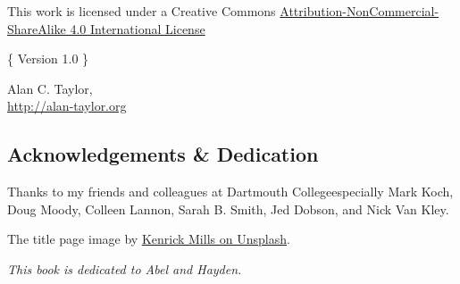 

\vspace*{4cm}
\begin{center}


\ccbyncsa 

\vspace{1cm}

This work is licensed under a Creative Commons \href{https://creativecommons.org/licenses/by-nc-sa/4.0/}{Attribution-NonCommercial-ShareAlike 4.0 International License}

\vspace{3cm}



\noindent \{ Version 1.0 \}



\end{center}


\begin{center}


\vfill

Alan C. Taylor, \the\year \\


\href{http://www.alan-taylor.org}{http://alan-taylor.org}
\end{center}




\newpage

\begin{center}\section*{Acknowledgements \& Dedication}\end{center}

\bigskip

\noindent Thanks to my friends and colleagues at Dartmouth College\textemdash especially Mark Koch, Doug Moody, Colleen Lannon, Sarah B. Smith, Jed Dobson, and Nick Van Kley.

\vspace{1cm}

\begin{center}
\noindent The title page image by \href{https://unsplash.com/photos/MF9Wy1NA55I}{Kenrick Mills on Unsplash}.
\end{center}

\vspace{3cm}


\vfill

\begin{center}\emph{This book is dedicated to Abel and Hayden.}\end{center}

\newpage